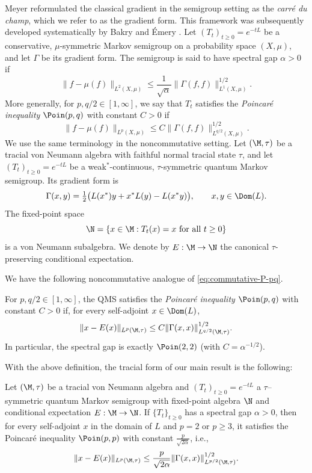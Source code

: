 \documentclass[sn-mathphys-num]{sn-jnl}
\begin{document}
Meyer \cite{meyer1976carre} reformulated the classical gradient in the
semigroup setting as the \textit{carr\'e du champ}, which we refer to as the gradient
form. This framework was subsequently developed systematically by Bakry and
{\'E}mery \cite{bakry-emery}. Let
$(T_t)_{t\ge0}=e^{-tL}$ be a conservative, $\mu$-symmetric Markov semigroup
on a probability space $(X,\mu)$, and let $\Gamma$ be its gradient form.
The semigroup is said to have spectral gap $\alpha>0$ if
\begin{equation}\label{eq:measure-Poincare}
  \|f-\mu(f)\|_{L^2(X,\mu)}
  \le \frac{1}{\sqrt{\alpha}}
  \|\Gamma(f,f)\|_{L^1(X,\mu)}^{1/2}.
\end{equation}
More generally, for $p,q/2\in[1,\infty]$, we say that $T_t$ satisfies the
\emph{Poincar\'e inequality} $\Poin(p,q)$ with constant $C>0$ if
\begin{equation}\label{eq:commutative-P-pq}
  \|f-\mu(f)\|_{L^p(X,\mu)}
  \le C\|\Gamma(f,f)\|_{L^{q/2}(X,\mu)}^{1/2}.
\end{equation}
We use the same terminology in the noncommutative setting.  Let
$(\M,\tau)$ be a tracial von Neumann algebra with faithful normal tracial
state $\tau$, and let $(T_t)_{t\ge0}=e^{-tL}$ be a weak$^*$-continuous,
$\tau$-symmetric quantum Markov semigroup.  Its gradient form is
\[
  \Gamma(x,y)
  =\tfrac12\bigl(L(x^*)y+x^*L(y)-L(x^*y)\bigr),
  \qquad x,y\in\Dom(L).
\]
The fixed-point space
\[
  \N=\{x\in\M:T_t(x)=x\text{ for all }t\ge0\}
\]
is a von Neumann subalgebra. We denote by $E:\M\to\N$ the canonical
$\tau$-preserving conditional expectation.

We have the following noncommutative analogue of \cref{eq:commutative-P-pq}.
\begin{definition}\label{def:Poin(p,q)}
For $p,q/2\in[1,\infty]$, the QMS satisfies the \emph{Poincar\'e
inequality} $\Poin(p,q)$ with constant $C>0$ if, for every self-adjoint
$x\in\Dom(L)$,
\begin{equation}\label{eq:P-pq}
  \|x-E(x)\|_{L^p(\M,\tau)}
  \le C\|\Gamma(x,x)\|_{L^{q/2}(\M,\tau)}^{1/2}.
\end{equation}
In particular, the spectral gap is exactly $\Poin(2,2)$ (with
$C=\alpha^{-1/2}$).
\end{definition}
With the above definition, the tracial form of our main result is the following:
\medskip
\begin{theorem}[$\Poin(p,p)$]\label{main:tracial}
Let $(\M,\tau)$ be a tracial von Neumann algebra and $(T_t)_{t\ge0}=e^{-tL}$ a $\tau$--symmetric quantum Markov semigroup with fixed-point algebra $\N$ and conditional expectation $E:\M\to\N$.
If $\{T_t\}_{t\ge0}$ has a spectral gap $\alpha>0$, then for every self-adjoint $x$ in the domain of $L$ and $p=2$ or $p\ge3$, it satisfies the Poincar\'e inequality $\Poin(p,p)$ with constant $\tfrac{p}{\sqrt{2\alpha}}$, i.e.,
\[
\|x-E(x)\|_{L^p(\M,\tau)}  \le  \frac{p}{\sqrt{2\alpha}} \|\Gamma(x,x)\|^{1/2}_{L^{p/2}(\M,\tau)}.
\]
\end{theorem}
\end{document}
